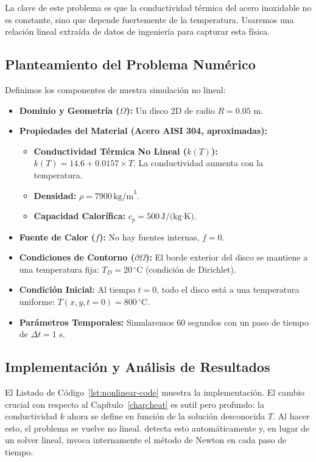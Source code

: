 La clave de este problema es que la conductividad térmica del acero inoxidable no es constante, sino que depende fuertemente de la temperatura. Usaremos una relación lineal extraída de datos de ingeniería para capturar esta física.

\subsection{Planteamiento del Problema Numérico}
Definimos los componentes de nuestra simulación no lineal:
\begin{itemize}
    \item \textbf{Dominio y Geometría (\(\Omega\)):} Un disco 2D de radio \(R = 0.05\) m.
    \item \textbf{Propiedades del Material (Acero AISI 304, aproximadas):}
    \begin{itemize}
        \item \textbf{Conductividad Térmica No Lineal (\(k(T)\)):} \(k(T) = 14.6 + 0.0157 \times T\). La conductividad aumenta con la temperatura.
        \item \textbf{Densidad:} \(\rho = 7900 \, \text{kg/m}^3\).
        \item \textbf{Capacidad Calorífica:} \(c_p = 500 \, \text{J/(kg·K)}\).
    \end{itemize}
    \item \textbf{Fuente de Calor (\(f\)):} No hay fuentes internas, \(f=0\).
    \item \textbf{Condiciones de Contorno (\(\partial\Omega\)):} El borde exterior del disco se mantiene a una temperatura fija: \(T_D = 20 \, ^\circ\text{C}\) (condición de Dirichlet).
    \item \textbf{Condición Inicial:} Al tiempo \(t=0\), todo el disco está a una temperatura uniforme: \(T(x,y,t=0) = 800 \, ^\circ\text{C}\).
    \item \textbf{Parámetros Temporales:} Simularemos 60 segundos con un paso de tiempo de \(\Delta t = 1\) s.
\end{itemize}

\subsection{Implementación y Análisis de Resultados}
El Listado de Código~\ref{lst:nonlinear-code} muestra la implementación. El cambio crucial con respecto al Capítulo~\ref{chap:heat} es sutil pero profundo: la conductividad \(k\) ahora se define en función de la solución desconocida \(T\). Al hacer esto, el problema se vuelve no lineal. \fenics detecta esto automáticamente y, en lugar de un solver lineal, invoca internamente el método de Newton en cada paso de tiempo.

